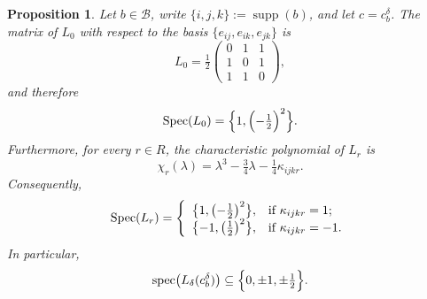 \documentclass[times,11pt,reqno]{amsproc}
\newtheorem{proposition}[theorem]{Proposition}
\theoremstyle{definition}
\numberwithin{equation}{section}
\DeclareMathOperator{\spec}{spec}
\DeclareMathOperator{\supp}{supp}
\DeclareMathOperator{\Spec}{Spec}
\begin{document}
\begin{proposition}\label{prop:blockmatrices}
Let $b\in\mathcal B$, write $\{i,j,k\}:=\supp(b)$, and let $c=c_b^\delta$. The matrix of $L_0$ with respect to the basis $\{e_{ij},e_{ik},e_{jk}\}$ is
\begin{equation}\label{L0matrix}
L_0
=
\tfrac12
\begin{pmatrix}
0&1&1\\
1&0&1\\
1&1&0
\end{pmatrix},
\end{equation}
and therefore
\begin{equation}\label{specL0}
\Spec(L_0)
=
\Bigl\{
1,
\Bigl(-\tfrac12\Bigr)^2
\Bigr\}.
\end{equation}
Furthermore, for every $r\in R$, the characteristic polynomial of $L_r$ is
\begin{equation}\label{charpolyr}
\chi_r(\lambda)
=
\lambda^3-\tfrac34\lambda-\tfrac14\kappa_{ijkr}.
\end{equation}
Consequently,
\begin{equation}\label{specplus}
\Spec(L_r)
=
\left\{
  \begin{array}{ll}
    \bigl\{1,\bigl(-\tfrac12\bigr)^2\bigr\}, & \hbox{if $\kappa_{ijkr}=1$;} \\
    \bigl\{-1,\bigl(\tfrac12\bigr)^2\bigr\}, & \hbox{if $\kappa_{ijkr}=-1$.}
  \end{array}
\right.
\end{equation}
In particular,
\begin{equation}\label{fiveeigen}
\spec\bigl(L_\delta(c_b^\delta)\bigr)
\subseteq
\Bigl\{
0,\pm1,\pm\tfrac12
\Bigr\}.
\end{equation}
\end{proposition}
\end{document}
